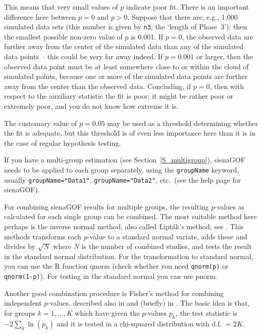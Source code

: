 \documentclass[a4paper,fleqn,11pt]{article}
\newcommand{\+}{\, + \,}
\newcommand{\sfn}[1]{\textsf{#1}}
\newcommand{\R}{{\sf R }}
\begin{document}
This means that very small values of $p$ indicate poor fit.
There is an important difference here between $p=0$ and $p>0$.
Suppose that there are, e.g., 1,000 simulated data sets
(this number is given by \texttt{n3}, the `length of Phase~3');
then the smallest possible non-zero value of $p$ is 0.001.
If $p=0$, the observed data are further away from the center of
the simulated data than any of the simulated data points -- this
could be very far away indeed. If $p=0.001$ or larger, then
the observed data point must be at least somewhere close to or within the
cloud of simulated points, because one or more of the simulated data
points are further away from the center than the observed data.
Concluding, if $p=0$, then with respect to the auxiliary statistic
the fit is poor; it might be rather poor or extremely poor,
and you do not know how extreme it is.

The customary value of $p=0.05$ may be used as a threshold determining
whether the fit is adequate, but this threshold is of even less
importance here than it is in the case of regular hypothesis testing.

If you have a multi-group estimation (see Section~\ref{S_multigroup}),
\textsf{sienaGOF} needs to be applied to each group separately,
using the \texttt{groupName} keyword, usually
\texttt{groupName="Data1"},  \texttt{groupName="Data2"}, etc.\
(see the help page for \textsf{sienaGOF}).

For combining \textsf{sienaGOF} results for multiple groups,
the resulting $p$-values
as calculated for each single group can be combined.
The most suitable method here perhaps is the inverse normal method,
also called Lipt\'{a}k's method; see \citet[][Section C.3]{HedgesOlkin85}.
This methods transforms each $p$-value to a standard normal variate, adds these
and divides by $\sqrt{N}$ where $N$ is the number of combined studies,
and tests the result in the standard normal distribution.
For the transformation to standard normal,
you can use the \R function \sfn{qnorm}
(check whether you need \texttt{qnorm(p)} or \texttt{qnorm(1-p)}).
For testing in the standard normal you can use \sfn{pnorm}.

Another good combination procedure is
Fisher's method for combining independent $p$-values, described also in
\citet{HedgesOlkin85} and (briefly) in \citet[Chapter 3]{SnijdersBosker12}.
The basic idea is that, for groups $k = 1, \ldots, K$
which have given the $p$-values $p_k$, the test statistic is
$- 2 \sum_k \ln(p_k)$ and it is tested in a chi-squared distribution
with d.f.\ = $2K$.
\end{document}
